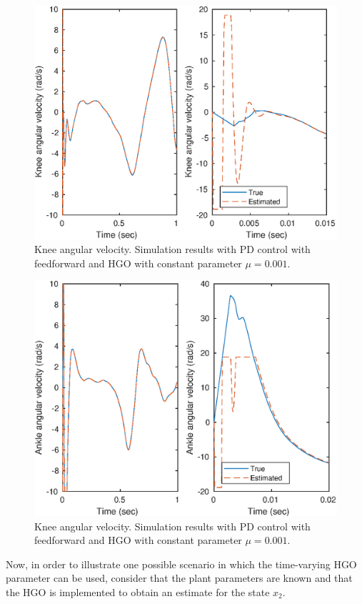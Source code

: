 \documentclass[letterpaper, 10 pt, conference]{ieeeconf}  %
\theoremstyle{plain}
\theoremstyle{definition}
\theoremstyle{remark}
\begin{document}
%
%
\begin{figure}[h!]
\begin{center}
\includegraphics[width = 13cm]{Figs/dq_knee_mu_1e-03.eps}
\caption{Knee angular velocity. Simulation results with PD control with feedforward and HGO with constant parameter $\mu=0.001$.}
\label{fig:dknee}
\end{center}
\end{figure}
%
%
\begin{figure}[h!]
	\begin{center}
	\includegraphics[width = 13cm]{Figs/dq_ankle_mu_1e-03.eps}
	\caption{Knee angular velocity. Simulation results with PD control with feedforward and HGO with constant parameter $\mu=0.001$.}
	\label{fig:dankle}
	\end{center}
	\end{figure}
Now, in order to illustrate one possible scenario in which the time-varying HGO parameter can be used, consider that the plant parameters are known and that the HGO is implemented to obtain an estimate for the state $x_2$. 
\end{document}
